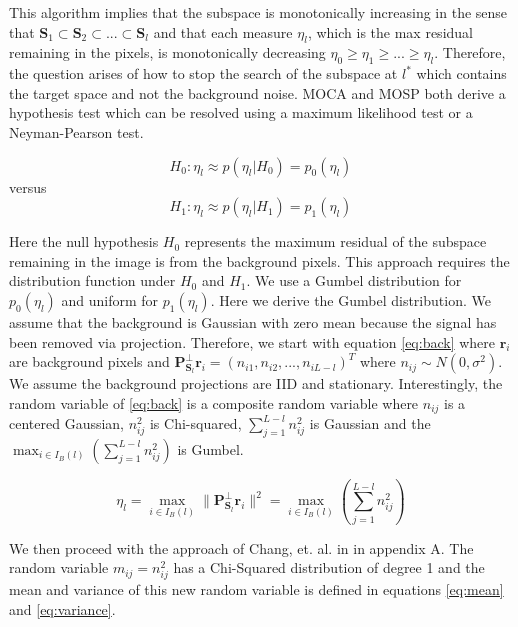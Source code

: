 \documentclass[paper=a4, fontsize=11pt]{article} %
\begin{document}
This algorithm implies that the subspace is monotonically increasing in the sense that \(\textbf{S}_1 \subset \textbf{S}_2 \subset ... \subset \textbf{S}_l\) and that each measure \(\eta_l\), which is the max residual remaining in the pixels, is monotonically decreasing \(\eta_0 \ge \eta_1 \ge ... \ge \eta_l\). Therefore, the question arises of how to stop the search of the subspace at \(l^*\) which contains the target space and not the background noise. MOCA and MOSP both derive a hypothesis test which can be resolved using a maximum likelihood test or a Neyman-Pearson test.

\begin{equation}
\label{eq:htest0}
H_0 : \eta_l \approx p(\eta_l | H_0) = p_0(\eta_l)
\end{equation}
versus
\begin{equation}
\label{eq:htest1}
H_1 : \eta_l \approx p(\eta_l | H_1) = p_1(\eta_l)
\end{equation}

Here the null hypothesis \(H_0\) represents the maximum residual of the subspace remaining in the image is from the background pixels. This approach requires the distribution function under \(H_0\) and \(H_1\). We use a Gumbel distribution for \(p_0(\eta_l)\) and uniform for \(p_1(\eta_l)\). Here we derive the Gumbel distribution. We assume that the background is Gaussian with zero mean because the signal has been removed via projection. Therefore, we start with equation \ref{eq:back} where \(\textbf{r}_i\) are background pixels and \(\textbf{P}_{\textbf{S}_l}^\perp\textbf{r}_i = (n_{i1}, n_{i2}, ..., n_{i L-l})^T\) where \(n_{ij} \sim N(0, \sigma^2)\). We assume the background projections are IID and stationary. Interestingly, the random variable of \ref{eq:back} is a composite random variable where \(n_{ij}\) is a centered Gaussian, \(n_{ij}^2\) is Chi-squared, \(\sum_{j=1}^{L-l}n_{ij}^2\) is Gaussian and the \(\max_{i \in I_B(l)}{\left(\sum_{j=1}^{L-l}n_{ij}^2\right)}\) is Gumbel.

\begin{equation}
\label{eq:back}
\eta_l = \max_{i\in I_{B}(l)} \|\textbf{P}_{\textbf{S}_l}^\perp\textbf{r}_i\|^2 = \max_{i \in I_B(l)}{\left(\sum_{j=1}^{L-l}n_{ij}^2\right)}
\end{equation}

We then proceed with the approach of Chang, et. al. in \cite{mosp} in appendix A. The random variable \(m_{ij} = n_{ij}^2 \) has a Chi-Squared distribution of degree 1 and the mean and variance of this new random variable is defined in equations \ref{eq:mean} and \ref{eq:variance}.
\end{document}
